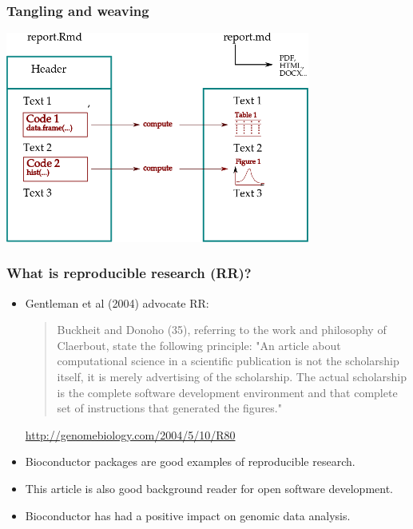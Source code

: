 \documentclass[]{beamer}\usepackage[]{graphicx}\usepackage[]{color}
\begin{document}
\begin{frame}
  \frametitle{Tangling and weaving}

  \centering \includegraphics[width=10cm]{rmd-to-md.png}
  
\end{frame}

\begin{frame}


  \frametitle{What is reproducible research (RR)?}

  \begin{itemize}
  \item Gentleman et al (2004) advocate RR:

    \begin{quote}
      Buckheit and Donoho (35), referring to the work and philosophy of
      Claerbout, state the following principle: "An article about
      computational science in a scientific publication is not the
      scholarship itself, it is merely advertising of the scholarship. The
      actual scholarship is the complete software development environment
      and that complete set of instructions that generated the figures."
    \end{quote}

    \url{http://genomebiology.com/2004/5/10/R80}


  \item  Bioconductor packages are good examples of reproducible
    research.
  \item  This article is also good background reader for open software
    development.
  \item  Bioconductor has had a positive impact on genomic data analysis.
  \end{itemize}


\end{frame}
\end{document}
